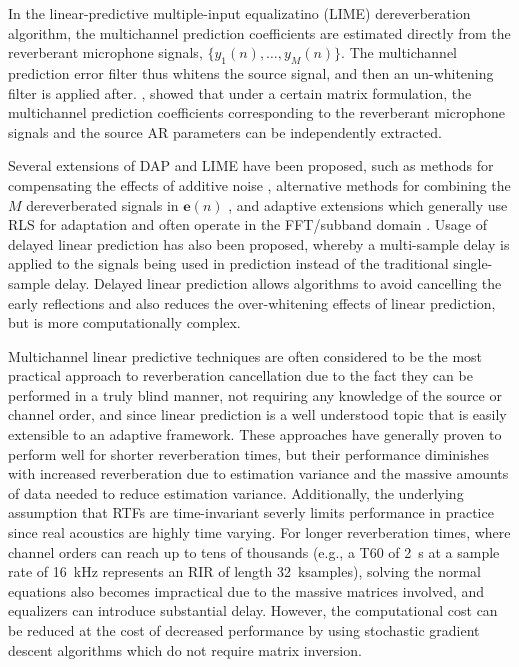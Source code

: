\noindent
In the linear-predictive multiple-input equalizatino (LIME) dereverberation algorithm, the multichannel prediction coefficients are estimated directly from the reverberant microphone signals, $\{y_1(n), \dots, y_M(n)\}$. The multichannel prediction error filter thus whitens the source signal, and then an un-whitening filter is applied after. \cite{delcroix2007precise}, showed that under a certain matrix formulation, the multichannel prediction coefficients corresponding to the reverberant microphone signals and the source AR parameters can be independently extracted.

Several extensions of DAP and LIME have been proposed, such as methods for compensating the effects of additive noise \citep[e.g., ][]{triki2007multivariate}, alternative methods for combining the $M$ dereverberated signals in $\boldsymbol{e}(n)$ \citep[e.g., ][]{triki2008robust}, and adaptive extensions which generally use RLS for adaptation and often operate in the FFT/subband domain \citep[e.g., ][]{jukic2016adaptive, jukic2016general}. Usage of delayed linear prediction \citep[i.e., multi-step linear prediction originally presented by ][]{gesbert1997robust} has also been proposed, whereby a multi-sample delay is applied to the signals being used in prediction instead of the traditional single-sample delay. Delayed linear prediction allows algorithms to avoid cancelling the early reflections and also reduces the over-whitening effects of linear prediction, but is more computationally complex. 

Multichannel linear predictive techniques are often considered to be the most practical approach to reverberation cancellation due to the fact they can be performed in a truly blind manner, not requiring any knowledge of the source or channel order, and since linear prediction is a well understood topic that is easily extensible to an adaptive framework. These approaches have generally proven to perform well for shorter reverberation times, but their performance diminishes with increased reverberation due to estimation variance and the massive amounts of data needed to reduce estimation variance. Additionally, the underlying assumption that RTFs are time-invariant severly limits performance in practice since real acoustics are highly time varying. For longer reverberation times, where channel orders can reach up to tens of thousands (e.g., a T60 of \qty{2}{\second} at a sample rate of \qty{16}{\kilo\hertz} represents an RIR of length \qty{32}{\kilo samples}), solving the normal equations also becomes impractical due to the massive matrices involved, and equalizers can introduce substantial delay. However, the computational cost can be reduced at the cost of decreased performance by using stochastic gradient descent algorithms which do not require matrix inversion.


